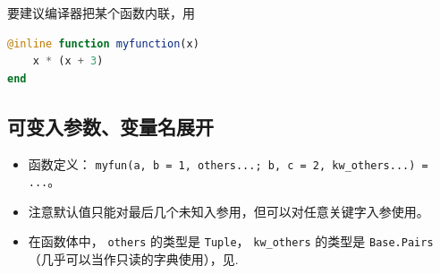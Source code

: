 要建议编译器把某个函数内联，用
\begin{lstlisting}[language=julia]
@inline function myfunction(x)
    x * (x + 3)
end
\end{lstlisting}

\subsection{可变入参数、变量名展开}
\begin{itemize}
\item 函数定义： \verb`myfun(a, b = 1, others...; b, c = 2, kw_others...) = ...`。
\item 注意默认值只能对最后几个未知入参用，但可以对任意关键字入参使用。
\item 在函数体中， \verb`others` 的类型是 \verb`Tuple`， \verb`kw_others` 的类型是 \verb`Base.Pairs`（几乎可以当作只读的字典使用），见.
\end{itemize}
